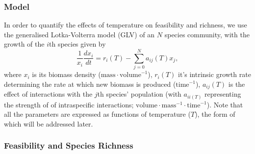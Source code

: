 \documentclass{article}
\begin{document}
\subsubsection*{Model}
In order to quantify the effects of temperature on feasibility and richness, we use the generalised Lotka-Volterra model (GLV) of an $N$ species community, with the growth of the $i$th species given by
\begin{equation} \label{EQ:GLVM}
  \frac{1}{x_i} \frac{dx_i}{dt} = r_i(T) - \sum^N_{j = 0} a_{ij}(T) x_j, 
\end{equation}
where $x_i$ is its biomass density ($\text{mass} \cdot \text{volume}^{-1}$), $r_i(T)$ it's intrinsic growth rate determining the rate at which new biomass is produced ($\text{time}^{-1}$), $a_{ij}(T)$ is the effect of interactions with the $j$th species' population (with $a_{ii(T)}$ representing the strength of of intraspecific interactions; $\text{volume} \cdot \text{mass}^{-1} \cdot \text{time}^{-1}$). Note that all the parameters are expressed as functions of temperature ($T$), the form of which will be addressed later. 

\subsubsection*{Feasibility and Species Richness} \label{SEC:Feas_SP_rich}
\end{document}

